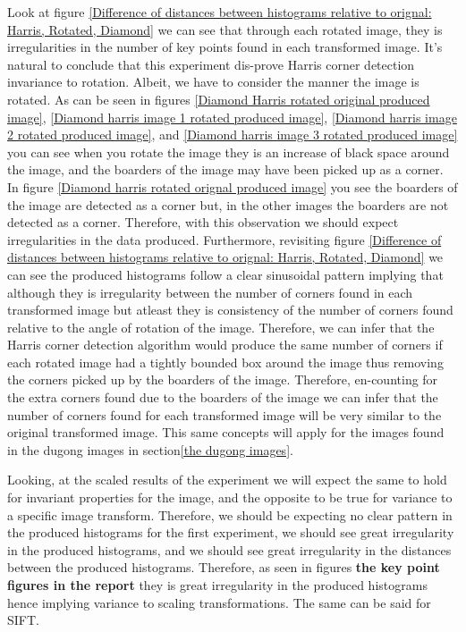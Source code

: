 \documentclass[conference]{IEEEtran}
\begin{document}
Look at figure \ref{Difference of distances between histograms relative to orignal: Harris, Rotated, Diamond} we can see that through each rotated image, they is irregularities in the number of key points found in each transformed image. It's natural to conclude that this experiment dis-prove Harris corner detection invariance to rotation. Albeit, we have to consider the manner the image is rotated. As can be seen in figures \ref{Diamond Harris rotated original produced image}, \ref{Diamond harris image 1 rotated produced image}, \ref{Diamond harris image 2 rotated produced image}, and \ref{Diamond harris image 3 rotated produced image} you can see when you rotate the image they is an increase of black space around the image, and the boarders of the image may have been picked up as a corner. In figure \ref{Diamond harris rotated orignal produced image} you see the boarders of the image are detected as a corner but, in the other images the boarders are not detected as a corner. Therefore, with this observation we should expect irregularities in the data produced. Furthermore, revisiting figure \ref{Difference of distances between histograms relative to orignal: Harris, Rotated, Diamond} we can see the produced histograms follow a clear sinusoidal pattern implying that although they is irregularity between the number of corners found in each transformed image but atleast they is consistency of the number of corners found relative to the angle of rotation of the image. Therefore, we can infer that the Harris corner detection algorithm would produce the same number of corners if each rotated image had a tightly bounded box around the image thus removing the corners picked up by the boarders of the image. Therefore, en-counting for the extra corners found due to the boarders of the image we can infer that the number of corners found for each transformed image will be very similar to the original transformed image. This same concepts will apply for the images found in the dugong images in section\ref{the dugong images}.\par

Looking, at the scaled results of the experiment we will expect the same to hold for invariant properties for the image, and the opposite to be true for variance to a specific image transform. Therefore, we should be expecting no clear pattern in the produced histograms for the first experiment, we should see great irregularity in the produced histograms, and we should see great irregularity in the distances between the produced histograms. Therefore, as seen in figures \textbf{the key point figures in the report} they is great irregularity in the produced histograms hence implying variance to scaling transformations. The same can be said for SIFT.
\end{document}
